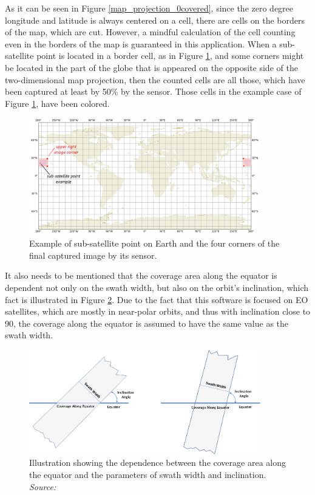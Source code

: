 As it can be seen in Figure \ref{map_projection_0covered}, since the zero degree longitude and latitude is always centered on a cell, there are cells on the borders of the map, which are cut. However, a mindful calculation of the cell counting even in the borders of the map is guaranteed in this application. When a sub-satellite point is located in a border cell, as in Figure \ref{correct_calculation}, and some corners might be located in the part of the globe that is appeared on the opposite side of the two-dimensional map projection, then the counted cells are all those, which have been captured at least by 50\% by the sensor. Those cells in the example case of Figure \ref{correct_calculation}, have been colored.

\begin{figure}
\centering
\includegraphics[width=0.9\textwidth]{Images/correct_calculation.png}\caption{Example of sub-satellite point on Earth and the four corners of the final captured image by its sensor.}
\label{correct_calculation}
\end{figure}

It also needs to be mentioned that the coverage area along the equator is dependent not only on the swath width, but also on the orbit's inclination, which fact is illustrated in Figure \ref{swath_width_groundtrack}. Due to the fact that this software is focused on EO satellites, which are mostly in near-polar orbits, and thus with inclination close to 90, the coverage along the equator is assumed to have the same value as the swath width.

\begin{figure}
\centering
\includegraphics[width=0.9\textwidth]{Images/swath_width_groundtrack.png}\caption{Illustration showing the dependence between the coverage area along the equator and the parameters of swath width and inclination. \textit{Source: \cite{Elachi}}}
\label{swath_width_groundtrack}
\end{figure}

